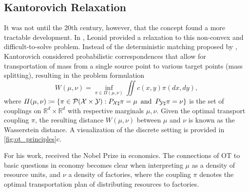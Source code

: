 \subsection{Kantorovich Relaxation} \label{sec:background_kantorovich}

It was not until the 20th century, however, that the concept found a more tractable development. In \citeyear{kantorovich1942transfer}, Leonid \citeauthor{kantorovich1942transfer} provided a relaxation to this non-convex and difficult-to-solve problem.
Instead of the deterministic matching proposed by \citeauthor{monge1781histoire}, Kantorovich considered probabilistic correspondences that allow for transportation of mass from a single source point to various target points (mass splitting), resulting in the problem formulation
\begin{equation} \label{eq:kantorovich}
    W(\mu, \nu) = \inf_{\pi\in \Pi(\mu,\nu)}\iint c(x, y) \pi(dx, dy),
\end{equation}
where $\Pi(\mu, \nu) \coloneqq \left\{\pi \in {\mathcal{P}}(\mathcal{X} \times \mathcal{Y}): P_{{\mathcal{X}} \sharp} \pi=\mu \, \text { and } \, P_{{\mathcal{Y}} \sharp} \pi=\nu\right\}$ is the set of couplings on $\mathbb{R}^d\times\mathbb{R}^d$ with respective marginals $\mu, \nu$. Given the optimal transport coupling $\pi$, the resulting distance $W(\mu, \nu)$ between $\mu$ and $\nu$ is known as the Wasserstein distance.
A visualization of the discrete setting is provided in \cref{fig:ot_principles}c.

For his work, \citeauthor{kantorovich1942transfer} received the Nobel Prize in economics. The connections of \acrshort{OT} to basic questions in economy becomes clear when interpreting $\mu$ as a density of resource units, and $\nu$ a density of factories, where the coupling $\pi$ denotes the optimal transportation plan of distributing resources to factories.

